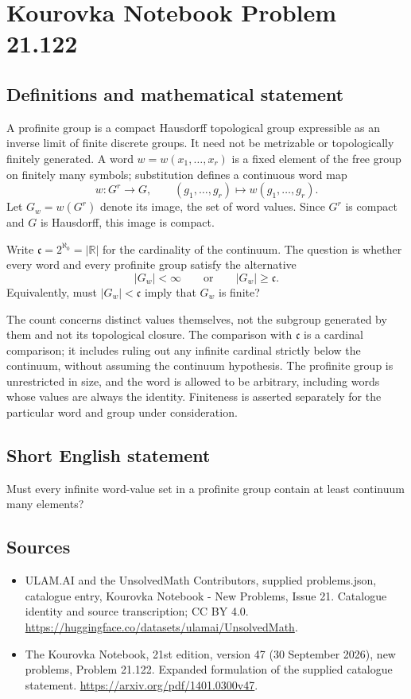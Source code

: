 \documentclass[11pt,a4paper]{article}
\begin{document}
\section*{Kourovka Notebook Problem 21.122}\label{statement}

\subsection{Definitions and mathematical statement}
A profinite group is a compact Hausdorff topological group expressible as an inverse limit of finite discrete groups. It need not be metrizable or topologically finitely generated. A word $w=w(x_1,\ldots,x_r)$ is a fixed element of the free group on finitely many symbols; substitution defines a continuous word map
\[
 w:G^r\longrightarrow G,
 \qquad (g_1,\ldots,g_r)\longmapsto w(g_1,\ldots,g_r).
\]
Let $G_w=w(G^r)$ denote its image, the set of word values. Since $G^r$ is compact and $G$ is Hausdorff, this image is compact.

Write $\mathfrak c=2^{\aleph_0}=|\mathbb R|$ for the cardinality of the continuum. The question is whether every word and every profinite group satisfy the alternative
\[
 |G_w|<\infty\qquad\text{or}\qquad |G_w|\ge\mathfrak c.
\]
Equivalently, must $|G_w|<\mathfrak c$ imply that $G_w$ is finite?

The count concerns distinct values themselves, not the subgroup generated by them and not its topological closure. The comparison with $\mathfrak c$ is a cardinal comparison; it includes ruling out any infinite cardinal strictly below the continuum, without assuming the continuum hypothesis. The profinite group is unrestricted in size, and the word is allowed to be arbitrary, including words whose values are always the identity. Finiteness is asserted separately for the particular word and group under consideration.
\subsection{Short English statement}
Must every infinite word-value set in a profinite group contain at least continuum many elements?
\subsection{Sources}
\begin{itemize}
\item[S1] ULAM.AI and the UnsolvedMath Contributors, supplied problems.json, catalogue entry, Kourovka Notebook - New Problems, Issue 21. Catalogue identity and source transcription; CC BY 4.0.
\url{https://huggingface.co/datasets/ulamai/UnsolvedMath}.
\item[S2] The Kourovka Notebook, 21st edition, version 47 (30 September 2026), new problems, Problem 21.122. Expanded formulation of the supplied catalogue statement.
\url{https://arxiv.org/pdf/1401.0300v47}.
\end{itemize}
\end{document}
